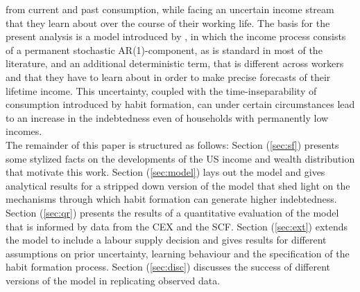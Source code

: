 from current and past consumption, while facing an uncertain income stream that they learn about over the course of their working life. The basis for the present analysis is a model introduced by \citet{Guvenen2007}, in which the income process consists of a permanent stochastic AR(1)-component, as is standard in most of the literature, and an additional deterministic term, that is different across workers and that they have to learn about in order to make precise forecasts of their lifetime income. This uncertainty, coupled with the time-inseparability of consumption introduced by habit formation, can under certain circumstances lead to an increase in the indebtedness even of households with permanently low incomes. \\
The remainder of this paper is structured as follows: Section (\ref{sec:sf}) presents some stylized facts on the developments of the US income and wealth distribution that motivate this work. Section (\ref{sec:model}) lays out the model and gives analytical results for a stripped down version of the model that shed light on the mechanisms through which habit formation can generate higher indebtedness. Section (\ref{sec:qr}) presents the results of a quantitative evaluation of the model that is informed by data from the CEX and the SCF. Section (\ref{sec:ext}) extends the model to include a labour supply decision and gives results for different assumptions on prior uncertainty, learning behaviour and the specification of the habit formation process. Section (\ref{sec:disc}) discusses the success of different versions of the model in replicating observed data. 


\pagebreak
